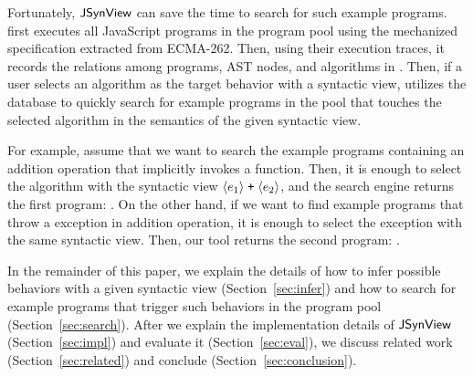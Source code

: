 Fortunately, $\tool$ can save the time to search for such example programs.
 first executes all JavaScript programs in the program
pool using the mechanized specification extracted from ECMA-262.  Then, using
their execution traces, it records the relations among programs, AST nodes, and
algorithms in .  Then, if a user selects an algorithm as
the target behavior with a syntactic view,  utilizes
the database to quickly search for example programs in the pool that touches the
selected algorithm in the semantics of the given syntactic view.

For example, assume that we want to search the example programs containing an
addition operation that implicitly invokes a function.  Then, it is enough to
select the  algorithm with the syntactic view $\svhole{\expr_1} \;
\code{+} \; \svhole{\expr_2}$, and the search engine returns the first program:
.  On the other hand, if we want to find
example programs that throw a  exception in addition
operation, it is enough to select the exception with the same syntactic view.
Then, our tool returns the second program: .

In the remainder of this paper, we explain the details of how to infer possible
behaviors with a given syntactic view (Section~\ref{sec:infer}) and how to
search for example programs that trigger such behaviors in the program pool
(Section~\ref{sec:search}).  After we explain the implementation details of
$\tool$ (Section~\ref{sec:impl}) and evaluate it (Section~\ref{sec:eval}), we
discuss related work (Section~\ref{sec:related}) and conclude
(Section~\ref{sec:conclusion}).
